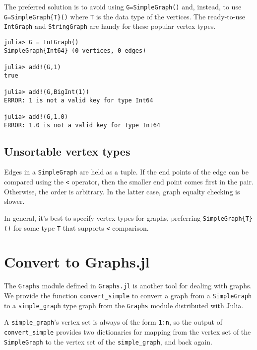 \documentclass[oneside]{amsart}
\begin{document}
The preferred solution is to avoid using \verb|G=SimpleGraph()|
and, instead, to use \verb|G=SimpleGraph{T}()| where \verb|T| is the
data type of the vertices. The ready-to-use \verb|IntGraph| and
\verb|StringGraph| are handy for these popular vertex types.
\begin{verbatim}
julia> G = IntGraph()
SimpleGraph{Int64} (0 vertices, 0 edges)

julia> add!(G,1)
true

julia> add!(G,BigInt(1))
ERROR: 1 is not a valid key for type Int64

julia> add!(G,1.0)
ERROR: 1.0 is not a valid key for type Int64
\end{verbatim}


\subsection*{Unsortable vertex types}

Edges in a \verb|SimpleGraph| are held as a tuple. If the end points
of the edge can be compared using the \verb|<| operator, then the
smaller end point comes first in the pair. Otherwise, the order is
arbitrary. In the latter case, graph equalty checking is slower.

In general, it's best to specify vertex types for graphs, preferring
\verb|SimpleGraph{T}()| for some type \verb|T| that supports \verb|<|
comparison.


\section{Convert to Graphs.jl}
\label{sect:convert}
The \verb|Graphs| module defined in \verb|Graphs.jl| is another tool
for dealing with graphs. We provide the function \verb|convert_simple|
to convert a graph from a \verb|SimpleGraph| to a
\verb|simple_graph| type graph from the \verb|Graphs| module
distributed with Julia.

A \verb|simple_graph|'s vertex set is always of the form \verb|1:n|,
so the output of \verb|convert_simple| provides two dictionaries for
mapping from the vertex set of the \verb|SimpleGraph| to the vertex set
of the \verb|simple_graph|, and back again.
\end{document}
